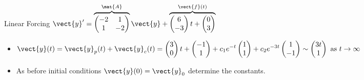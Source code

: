 \begin{frame}{Linear Forcing \qquad $\vect{y}'=\overbrace{\begin{pmatrix}-2&1\\1&-2\end{pmatrix}}^{\mat{A}}\vect{y}+\overbrace{\begin{pmatrix}6\\-3\end{pmatrix}t+\begin{pmatrix}0\\3\end{pmatrix}}^{\vect{f}(t)}$}
\begin{itemize}
\[  \]
  \[
    \color{blue}
    \mat{A}\vect{b}=\vect{a}-\begin{pmatrix}0\\3\end{pmatrix}
    =\begin{pmatrix}3\\-3\end{pmatrix}
    \quad\Longrightarrow\quad
    \left[\begin{array}{rr|r}-2&1&3\\1&-2&-3\end{array}\right]
    \sim\left[\begin{array}{rr|r}1&0&-1\\0&1&1\end{array}\right]
    \quad\Longrightarrow\quad\vect{b}=\begin{pmatrix}-1\\1\end{pmatrix}
  \]
  \item $\displaystyle \vect{y}(t)=\vect{y}_p(t)+\vect{y}_c(t)=\begin{pmatrix}3\\0\end{pmatrix}t+\begin{pmatrix}-1\\1\end{pmatrix} +c_1e^{-t}\begin{pmatrix}1\\1\end{pmatrix} +c_2e^{-3t}\begin{pmatrix}1\\-1\end{pmatrix} \sim \begin{pmatrix}3t\\1\end{pmatrix}\text{ as }t\to\infty$
  \item As before initial conditions $\vect{y}(0)=\vect{y}_0$ determine the constants.
\end{itemize}
\end{frame}
